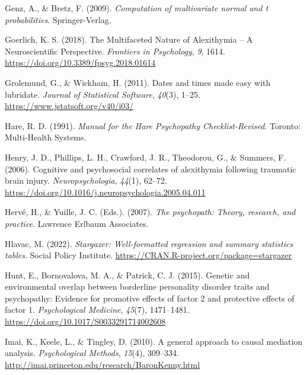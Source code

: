 \documentclass[
  man,floatsintext]{apa7}
\newlength{\cslhangindent}
\newlength{\cslentryspacingunit} %
\newenvironment{CSLReferences}[2] %
 {%
  \setlength{\parindent}{0pt}
  \ifodd #1
  \let\oldpar\par
  \def\par{\hangindent=\cslhangindent\oldpar}
  \fi
  \setlength{\parskip}{#2\cslentryspacingunit}
 }%
 {}
\begin{document}
\begin{CSLReferences}{1}{0}
\leavevmode{}%
Genz, A., \& Bretz, F. (2009). \emph{Computation of multivariate normal and t probabilities}. Springer-Verlag.

\leavevmode{}%
Goerlich, K. S. (2018). The {Multifaceted Nature} of {Alexithymia} -- {A Neuroscientific Perspective}. \emph{Frontiers in Psychology}, \emph{9}, 1614. \url{https://doi.org/10.3389/fpsyg.2018.01614}

\leavevmode{}%
Grolemund, G., \& Wickham, H. (2011). Dates and times made easy with {lubridate}. \emph{Journal of Statistical Software}, \emph{40}(3), 1--25. \url{https://www.jstatsoft.org/v40/i03/}

\leavevmode{}%
Hare, R. D. (1991). \emph{Manual for the {Hare Psychopathy Checklist-Revised}}. {Toronto: Multi-Health Systems}.

\leavevmode{}%
Henry, J. D., Phillips, L. H., Crawford, J. R., Theodorou, G., \& Summers, F. (2006). Cognitive and psychosocial correlates of alexithymia following traumatic brain injury. \emph{Neuropsychologia}, \emph{44}(1), 62--72. \url{https://doi.org/10.1016/j.neuropsychologia.2005.04.011}

\leavevmode{}%
Hervé, H., \& Yuille, J. C. (Eds.). (2007). \emph{The psychopath: Theory, research, and practice}. {Lawrence Erlbaum Associates}.

\leavevmode{}%
Hlavac, M. (2022). \emph{Stargazer: Well-formatted regression and summary statistics tables}. Social Policy Institute. \url{https://CRAN.R-project.org/package=stargazer}

\leavevmode{}%
Hunt, E., Bornovalova, M. A., \& Patrick, C. J. (2015). Genetic and environmental overlap between borderline personality disorder traits and psychopathy: Evidence for promotive effects of factor 2 and protective effects of factor 1. \emph{Psychological Medicine}, \emph{45}(7), 1471--1481. \url{https://doi.org/10.1017/S0033291714002608}

\leavevmode{}%
Imai, K., Keele, L., \& Tingley, D. (2010). A general approach to causal mediation analysis. \emph{Psychological Methods}, \emph{15}(4), 309--334. \url{http://imai.princeton.edu/research/BaronKenny.html}


\end{CSLReferences}
\end{document}
